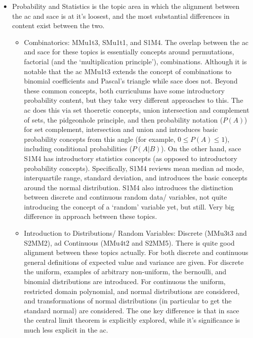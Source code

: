 \documentclass[twoside,12pt,a4paper]{report}
\begin{document}
\begin{itemize}
	\item Probability and Statistics is the topic area in which the alignment between the \gls{ac} and \gls{sace} is at it's loosest, and the most substantial differences in content exist between the two.  
		\begin{itemize}
			\item Combinatorics: MMu1t3, SMu1t1, and S1M4. The overlap between the \gls{ac} and \gls{sace} for these topics is essentially concepts around permutations, factorial (and the `multiplication principle'), combinations. Although it is notable that the \gls{ac} MMu1t3 extends the concept of combinations to binomial coefficients and Pascal's triangle while \gls{sace} does not. Beyond these common concepts, both curriculums have some introductory probability content, but they take very different approaches to this. The \gls{ac} does this via set thoeretic concepts, union intersection and complement of sets, the pidgeonhole principle, and then probability notation ($P(A)$) for set complement, intersection and union and introduces basic probability concepts from this angle (for example, $0 \leq P(A) \leq 1$), including conditional probabilities ($P(A|B)$). On the other hand, \gls{sace} S1M4 has introductory statistics concepts (as opposed to introductory probability concepts). Specifically, S1M4 reviews mean median ad mode, interquartile range, standard deviation, and introduces the basic concepts around the normal distribution. S1M4 also introduces the distinction between discrete and continuous random data/ variables, not quite introducing the concept of a `random' variable yet, but still. Very big difference in approach between these topics.  
			\item Introduction to Distributions/ Random Variables: Discrete (MMu3t3 and S2MM2), ad Continuous (MMu4t2 and S2MM5). There is quite good alignment between these topics actually. For both discrete and continuous general definitions of expected value and variance are given. For discrete the uniform, examples of arbitrary non-uniform, the bernoulli, and binomial distributions are introduced. For continuous the uniform, restricted domain polynomial, and normal distributions are considered, and transformations of normal distributions (in particular to get the standard normal) are considered. The one key difference is that in \gls{sace} the central limit theorem is explicitly explored, while it's significance is much less explicit in the \gls{ac}.

\end{itemize}
\end{itemize}
\end{document}
